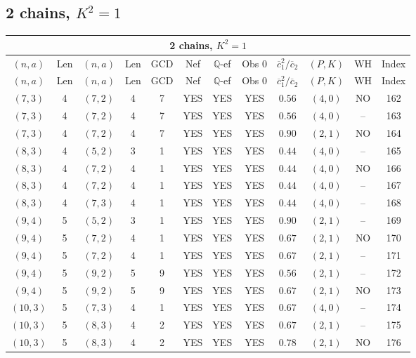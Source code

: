 \subsection{2 chains, $K^2 = 1$}
\begin{longtable}{|c|c|c|c|c|c|c|c|c|c|c|c|}
\hline
\multicolumn{12}{|c|}{2 chains, $K^2 = 1$}\\
\hline
$(n,a)$ & Len & $(n,a)$ & Len & GCD & Nef & $\mathbb Q$-ef & Obs 0 & $\overline c_1^2 / \overline c_2$ & $(P,K)$ & WH & Index\\
\hline
\endfirsthead

\hline
$(n,a)$ & Len & $(n,a)$ & Len & GCD & Nef & $\mathbb Q$-ef & Obs 0 & $\overline c_1^2 / \overline c_2$ & $(P,K)$ & WH & Index\\
\hline
\endhead
\hline
\endfoot

$(7,3)$ & 4 & $(7,2)$ & 4 & 7 & YES & YES & YES & $0.56$ & $(4,0)$ & NO & 162\\
$(7,3)$ & 4 & $(7,2)$ & 4 & 7 & YES & YES & YES & $0.56$ & $(4,0)$ & -- & 163\\
$(7,3)$ & 4 & $(7,2)$ & 4 & 7 & YES & YES & YES & $0.90$ & $(2,1)$ & NO & 164\\
$(8,3)$ & 4 & $(5,2)$ & 3 & 1 & YES & YES & YES & $0.44$ & $(4,0)$ & -- & 165\\
$(8,3)$ & 4 & $(7,2)$ & 4 & 1 & YES & YES & YES & $0.44$ & $(4,0)$ & NO & 166\\
$(8,3)$ & 4 & $(7,2)$ & 4 & 1 & YES & YES & YES & $0.44$ & $(4,0)$ & -- & 167\\
$(8,3)$ & 4 & $(7,3)$ & 4 & 1 & YES & YES & YES & $0.44$ & $(4,0)$ & -- & 168\\
$(9,4)$ & 5 & $(5,2)$ & 3 & 1 & YES & YES & YES & $0.90$ & $(2,1)$ & -- & 169\\
$(9,4)$ & 5 & $(7,2)$ & 4 & 1 & YES & YES & YES & $0.67$ & $(2,1)$ & NO & 170\\
$(9,4)$ & 5 & $(7,2)$ & 4 & 1 & YES & YES & YES & $0.67$ & $(2,1)$ & -- & 171\\
$(9,4)$ & 5 & $(9,2)$ & 5 & 9 & YES & YES & YES & $0.56$ & $(2,1)$ & -- & 172\\
$(9,4)$ & 5 & $(9,2)$ & 5 & 9 & YES & YES & YES & $0.67$ & $(2,1)$ & NO & 173\\
$(10,3)$ & 5 & $(7,3)$ & 4 & 1 & YES & YES & YES & $0.67$ & $(4,0)$ & -- & 174\\
$(10,3)$ & 5 & $(8,3)$ & 4 & 2 & YES & YES & YES & $0.67$ & $(2,1)$ & -- & 175\\
$(10,3)$ & 5 & $(8,3)$ & 4 & 2 & YES & YES & YES & $0.78$ & $(2,1)$ & NO & 176\\

\end{longtable}
